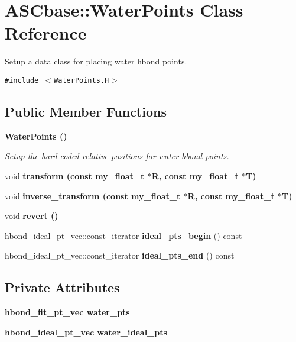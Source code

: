 \section{ASCbase::Water\-Points Class Reference}
\label{classASCbase_1_1WaterPoints}
Setup a data class for placing water hbond points.  


{\tt \#include $<$Water\-Points.H$>$}

\subsection*{Public Member Functions}
\begin{CompactItemize}
\item 
\bf{Water\-Points} ()\label{classASCbase_1_1WaterPoints_1e8c62ea849bff31c173ef1aeb4a0793}

\begin{CompactList}\small\item\em Setup the hard coded relative positions for water hbond points. \item\end{CompactList}\item 
void \bf{transform} (const my\_\-float\_\-t $\ast$R, const my\_\-float\_\-t $\ast$T)
\item 
void \bf{inverse\_\-transform} (const my\_\-float\_\-t $\ast$R, const my\_\-float\_\-t $\ast$T)
\item 
void \bf{revert} ()
\item 
hbond\_\-ideal\_\-pt\_\-vec::const\_\-iterator \textbf{ideal\_\-pts\_\-begin} () const \label{classASCbase_1_1WaterPoints_f65c3e88f37976c4fe26a19873064d16}

\item 
hbond\_\-ideal\_\-pt\_\-vec::const\_\-iterator \textbf{ideal\_\-pts\_\-end} () const \label{classASCbase_1_1WaterPoints_6343e72889915476801eeb9210cc691b}

\end{CompactItemize}
\subsection*{Private Attributes}
\begin{CompactItemize}
\item 
\bf{hbond\_\-fit\_\-pt\_\-vec} \textbf{water\_\-pts}\label{classASCbase_1_1WaterPoints_05e17c99a13206483c15d0d640bebf9e}

\item 
\bf{hbond\_\-ideal\_\-pt\_\-vec} \textbf{water\_\-ideal\_\-pts}\label{classASCbase_1_1WaterPoints_b5125b530f71709362fb5b26847becb2}

\end{CompactItemize}
